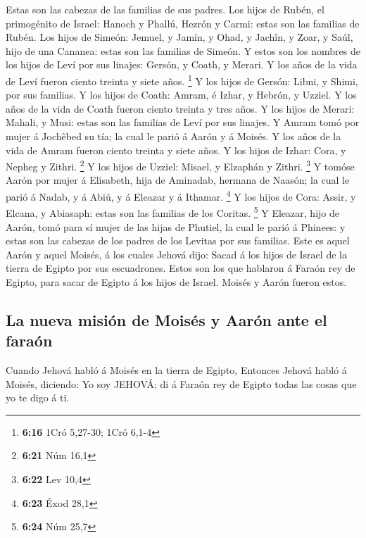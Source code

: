 Estas son las cabezas de las familias de sus padres. Los
hijos de Rubén, el primogénito de Israel: Hanoch y Phallú, Hezrón y
Carmi: estas son las familias de Rubén.  Los hijos de
Simeón: Jemuel, y Jamín, y Ohad, y Jachîn, y Zoar, y Saúl, hijo de una
Cananea: estas son las familias de Simeón.  Y estos son los
nombres de los hijos de Leví por sus linajes: Gersón, y Coath, y Merari.
Y los años de la vida de Leví fueron ciento treinta y siete años.
\footnote{\textbf{6:16} 1Cró 5,27-30; 1Cró 6,1-4}  Y los
hijos de Gersón: Libni, y Shimi, por sus familias.  Y los
hijos de Coath: Amram, é Izhar, y Hebrón, y Uzziel. Y los años de la
vida de Coath fueron ciento treinta y tres años.  Y los
hijos de Merari: Mahali, y Musi: estas son las familias de Leví por sus
linajes.  Y Amram tomó por mujer á Jochêbed su tía; la cual
le parió á Aarón y á Moisés. Y los años de la vida de Amram fueron
ciento treinta y siete años.  Y los hijos de Izhar: Cora, y
Nepheg y Zithri. \footnote{\textbf{6:21} Núm 16,1}  Y los
hijos de Uzziel: Misael, y Elzaphán y Zithri. \footnote{\textbf{6:22}
  Lev 10,4}  Y tomóse Aarón por mujer á Elisabeth, hija de
Aminadab, hermana de Naasón; la cual le parió á Nadab, y á Abiú, y á
Eleazar y á Ithamar. \footnote{\textbf{6:23} Éxod 28,1}  Y
los hijos de Cora: Assir, y Elcana, y Abiasaph: estas son las familias
de los Coritas. \footnote{\textbf{6:24} Núm 25,7}  Y
Eleazar, hijo de Aarón, tomó para sí mujer de las hijas de Phutiel, la
cual le parió á Phinees: y estas son las cabezas de los padres de los
Levitas por sus familias.  Este es aquel Aarón y aquel
Moisés, á los cuales Jehová dijo: Sacad á los hijos de Israel de la
tierra de Egipto por sus escuadrones.  Estos son los que
hablaron á Faraón rey de Egipto, para sacar de Egipto á los hijos de
Israel. Moisés y Aarón fueron estos.

\hypertarget{la-nueva-misiuxf3n-de-moisuxe9s-y-aaruxf3n-ante-el-farauxf3n}{%
\subsection{La nueva misión de Moisés y Aarón ante el
faraón}\label{la-nueva-misiuxf3n-de-moisuxe9s-y-aaruxf3n-ante-el-farauxf3n}}

 Cuando Jehová habló á Moisés en la tierra de Egipto,
 Entonces Jehová habló á Moisés, diciendo: Yo soy JEHOVÁ;
di á Faraón rey de Egipto todas las cosas que yo te digo á ti.

